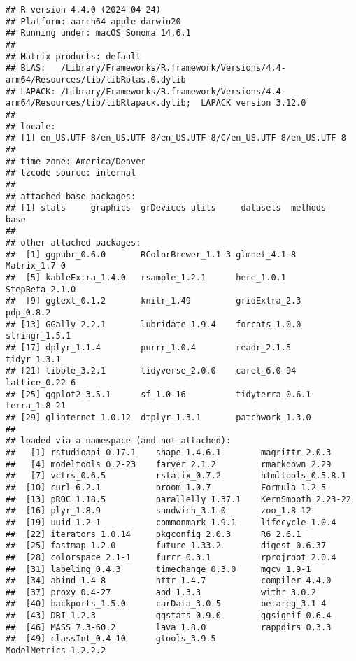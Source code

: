 \documentclass[
]{article}
\begin{document}
\begin{verbatim}
## R version 4.4.0 (2024-04-24)
## Platform: aarch64-apple-darwin20
## Running under: macOS Sonoma 14.6.1
## 
## Matrix products: default
## BLAS:   /Library/Frameworks/R.framework/Versions/4.4-arm64/Resources/lib/libRblas.0.dylib 
## LAPACK: /Library/Frameworks/R.framework/Versions/4.4-arm64/Resources/lib/libRlapack.dylib;  LAPACK version 3.12.0
## 
## locale:
## [1] en_US.UTF-8/en_US.UTF-8/en_US.UTF-8/C/en_US.UTF-8/en_US.UTF-8
## 
## time zone: America/Denver
## tzcode source: internal
## 
## attached base packages:
## [1] stats     graphics  grDevices utils     datasets  methods   base     
## 
## other attached packages:
##  [1] ggpubr_0.6.0       RColorBrewer_1.1-3 glmnet_4.1-8       Matrix_1.7-0      
##  [5] kableExtra_1.4.0   rsample_1.2.1      here_1.0.1         StepBeta_2.1.0    
##  [9] ggtext_0.1.2       knitr_1.49         gridExtra_2.3      pdp_0.8.2         
## [13] GGally_2.2.1       lubridate_1.9.4    forcats_1.0.0      stringr_1.5.1     
## [17] dplyr_1.1.4        purrr_1.0.4        readr_2.1.5        tidyr_1.3.1       
## [21] tibble_3.2.1       tidyverse_2.0.0    caret_6.0-94       lattice_0.22-6    
## [25] ggplot2_3.5.1      sf_1.0-16          tidyterra_0.6.1    terra_1.8-21      
## [29] glinternet_1.0.12  dtplyr_1.3.1       patchwork_1.3.0   
## 
## loaded via a namespace (and not attached):
##   [1] rstudioapi_0.17.1    shape_1.4.6.1        magrittr_2.0.3      
##   [4] modeltools_0.2-23    farver_2.1.2         rmarkdown_2.29      
##   [7] vctrs_0.6.5          rstatix_0.7.2        htmltools_0.5.8.1   
##  [10] curl_6.2.1           broom_1.0.7          Formula_1.2-5       
##  [13] pROC_1.18.5          parallelly_1.37.1    KernSmooth_2.23-22  
##  [16] plyr_1.8.9           sandwich_3.1-0       zoo_1.8-12          
##  [19] uuid_1.2-1           commonmark_1.9.1     lifecycle_1.0.4     
##  [22] iterators_1.0.14     pkgconfig_2.0.3      R6_2.6.1            
##  [25] fastmap_1.2.0        future_1.33.2        digest_0.6.37       
##  [28] colorspace_2.1-1     furrr_0.3.1          rprojroot_2.0.4     
##  [31] labeling_0.4.3       timechange_0.3.0     mgcv_1.9-1          
##  [34] abind_1.4-8          httr_1.4.7           compiler_4.4.0      
##  [37] proxy_0.4-27         aod_1.3.3            withr_3.0.2         
##  [40] backports_1.5.0      carData_3.0-5        betareg_3.1-4       
##  [43] DBI_1.2.3            ggstats_0.9.0        ggsignif_0.6.4      
##  [46] MASS_7.3-60.2        lava_1.8.0           rappdirs_0.3.3      
##  [49] classInt_0.4-10      gtools_3.9.5         ModelMetrics_1.2.2.2

\end{verbatim}
\end{document}

